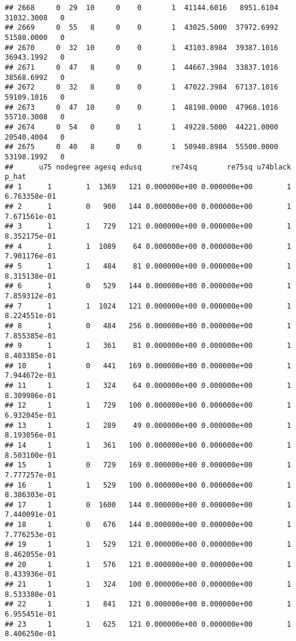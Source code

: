 \documentclass[
]{article}
\begin{document}
\begin{enumerate}
\begin{verbatim}
## 2668     0  29  10     0    0       1  41144.6016   8951.6104  31032.3008   0
## 2669     0  55   8     0    0       1  43025.5000  37972.6992  51580.0000   0
## 2670     0  32  10     0    0       1  43103.8984  39387.1016  36943.1992   0
## 2671     0  47   8     0    0       1  44667.3984  33837.1016  38568.6992   0
## 2672     0  32   8     0    0       1  47022.3984  67137.1016  59109.1016   0
## 2673     0  47  10     0    0       1  48198.0000  47968.1016  55710.3008   0
## 2674     0  54   0     0    1       1  49228.5000  44221.0000  20540.4004   0
## 2675     0  40   8     0    0       1  50940.8984  55500.0000  53198.1992   0
##      u75 nodegree agesq edusq       re74sq       re75sq u74black         p_hat
## 1      1        1  1369   121 0.000000e+00 0.000000e+00        1  6.763358e-01
## 2      1        0   900   144 0.000000e+00 0.000000e+00        1  7.671561e-01
## 3      1        1   729   121 0.000000e+00 0.000000e+00        1  8.352175e-01
## 4      1        1  1089    64 0.000000e+00 0.000000e+00        1  7.901176e-01
## 5      1        1   484    81 0.000000e+00 0.000000e+00        1  8.315138e-01
## 6      1        0   529   144 0.000000e+00 0.000000e+00        1  7.859312e-01
## 7      1        1  1024   121 0.000000e+00 0.000000e+00        1  8.224551e-01
## 8      1        0   484   256 0.000000e+00 0.000000e+00        1  7.855385e-01
## 9      1        1   361    81 0.000000e+00 0.000000e+00        1  8.403385e-01
## 10     1        0   441   169 0.000000e+00 0.000000e+00        1  7.944672e-01
## 11     1        1   324    64 0.000000e+00 0.000000e+00        1  8.309986e-01
## 12     1        1   729   100 0.000000e+00 0.000000e+00        1  6.932045e-01
## 13     1        1   289    49 0.000000e+00 0.000000e+00        1  8.193056e-01
## 14     1        1   361   100 0.000000e+00 0.000000e+00        1  8.503100e-01
## 15     1        0   729   169 0.000000e+00 0.000000e+00        1  7.777257e-01
## 16     1        1   529   100 0.000000e+00 0.000000e+00        1  8.386303e-01
## 17     1        0  1600   144 0.000000e+00 0.000000e+00        1  7.440091e-01
## 18     1        0   676   144 0.000000e+00 0.000000e+00        1  7.776253e-01
## 19     1        1   529   121 0.000000e+00 0.000000e+00        1  8.462055e-01
## 20     1        1   576   121 0.000000e+00 0.000000e+00        1  8.433936e-01
## 21     1        1   324   100 0.000000e+00 0.000000e+00        1  8.533380e-01
## 22     1        1   841   121 0.000000e+00 0.000000e+00        1  6.955451e-01
## 23     1        1   625   121 0.000000e+00 0.000000e+00        1  8.406250e-01

\end{verbatim}
\end{enumerate}
\end{document}
